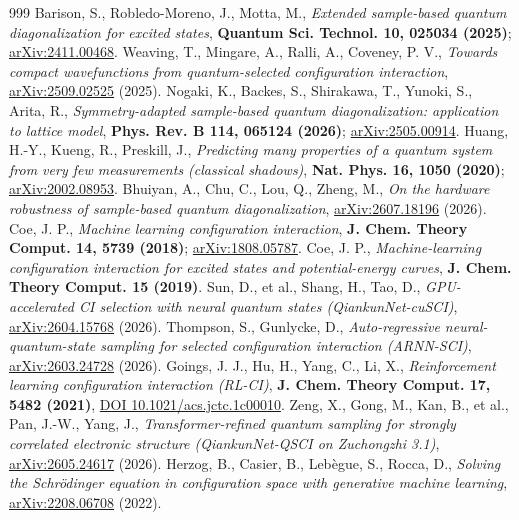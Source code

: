 \documentclass[11pt]{article}
\begin{document}
\begin{thebibliography}{999}
 Barison, S., Robledo-Moreno, J., Motta, M., \emph{Extended sample-based quantum diagonalization for excited states}, \textbf{Quantum Sci. Technol. 10, 025034 (2025)}; \href{https://arxiv.org/abs/2411.00468}{arXiv:2411.00468}.
 Weaving, T., Mingare, A., Ralli, A., Coveney, P. V., \emph{Towards compact wavefunctions from quantum-selected configuration interaction}, \href{https://arxiv.org/abs/2509.02525}{arXiv:2509.02525} (2025).
 Nogaki, K., Backes, S., Shirakawa, T., Yunoki, S., Arita, R., \emph{Symmetry-adapted sample-based quantum diagonalization: application to lattice model}, \textbf{Phys. Rev. B 114, 065124 (2026)}; \href{https://arxiv.org/abs/2505.00914}{arXiv:2505.00914}.
 Huang, H.-Y., Kueng, R., Preskill, J., \emph{Predicting many properties of a quantum system from very few measurements (classical shadows)}, \textbf{Nat. Phys. 16, 1050 (2020)}; \href{https://arxiv.org/abs/2002.08953}{arXiv:2002.08953}.
 Bhuiyan, A., Chu, C., Lou, Q., Zheng, M., \emph{On the hardware robustness of sample-based quantum diagonalization}, \href{https://arxiv.org/abs/2607.18196}{arXiv:2607.18196} (2026).
 Coe, J. P., \emph{Machine learning configuration interaction}, \textbf{J. Chem. Theory Comput. 14, 5739 (2018)}; \href{https://arxiv.org/abs/1808.05787}{arXiv:1808.05787}.
 Coe, J. P., \emph{Machine-learning configuration interaction for excited states and potential-energy curves}, \textbf{J. Chem. Theory Comput. 15 (2019)}.
 Sun, D., et al., Shang, H., Tao, D., \emph{GPU-accelerated CI selection with neural quantum states (QiankunNet-cuSCI)}, \href{https://arxiv.org/abs/2604.15768}{arXiv:2604.15768} (2026).
 Thompson, S., Gunlycke, D., \emph{Auto-regressive neural-quantum-state sampling for selected configuration interaction (ARNN-SCI)}, \href{https://arxiv.org/abs/2603.24728}{arXiv:2603.24728} (2026).
 Goings, J. J., Hu, H., Yang, C., Li, X., \emph{Reinforcement learning configuration interaction (RL-CI)}, \textbf{J. Chem. Theory Comput. 17, 5482 (2021)}, \href{https://doi.org/10.1021/acs.jctc.1c00010}{DOI 10.1021/acs.jctc.1c00010}.
 Zeng, X., Gong, M., Kan, B., et al., Pan, J.-W., Yang, J., \emph{Transformer-refined quantum sampling for strongly correlated electronic structure (QiankunNet-QSCI on Zuchongzhi 3.1)}, \href{https://arxiv.org/abs/2605.24617}{arXiv:2605.24617} (2026).
 Herzog, B., Casier, B., Lebègue, S., Rocca, D., \emph{Solving the Schrödinger equation in configuration space with generative machine learning}, \href{https://arxiv.org/abs/2208.06708}{arXiv:2208.06708} (2022).

\end{thebibliography}
\end{document}
